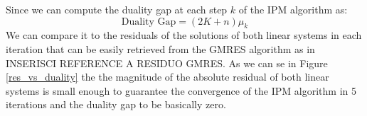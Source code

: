 \noindent Since we can compute the duality gap at each step \(k\) of the IPM algorithm as:
\[
	\text{Duality Gap} = (2K + n)\mu_k
\]
We can compare it to the residuals of the solutions of both linear systems in each iteration that can be easily retrieved from the GMRES algorithm as in INSERISCI REFERENCE A RESIDUO GMRES. As we can se in Figure \ref{res_vs_duality} the the magnitude of the absolute residual of both linear systems is small enough to  guarantee the convergence of the IPM algorithm in 5 iterations and the duality gap to be basically zero. 